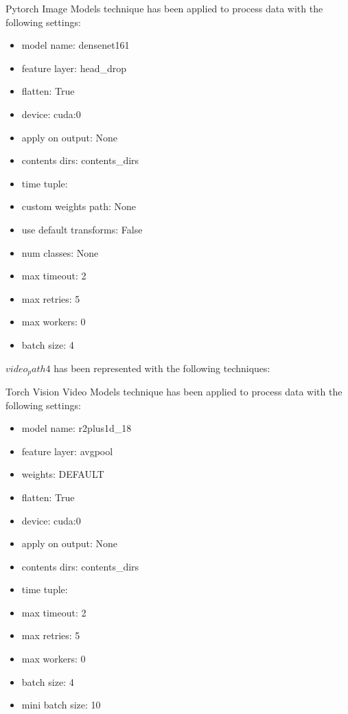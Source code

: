 \documentclass[11pt]{article}
\begin{document}
Pytorch Image Models technique has been applied to process data with the following settings:
\begin{itemize}
    \item model name: densenet161
    \item feature layer: head\_drop
    \item flatten: True
    \item device:  cuda:0
    \item apply on output: None
    \item contents dirs: contents\_dirs
    \item time tuple:
    \item custom weights path: None
    \item use default transforms: False
    \item num classes: None
    \item max timeout: 2
    \item max retries: 5
    \item max workers: 0
    \item batch size:  4
\end{itemize}
\hfill\break
\hfill\break









$ video_path4 $  has been represented with the following techniques:
\hfill\break
\hfill\break



Torch Vision Video Models technique has been applied to process data with the following settings:
\begin{itemize}
    \item model name: r2plus1d\_18
    \item feature layer: avgpool
    \item weights: DEFAULT
    \item flatten: True
    \item device:  cuda:0
    \item apply on output: None
    \item contents dirs: contents\_dirs
    \item time tuple:
    \item max timeout: 2
    \item max retries: 5
    \item max workers: 0
    \item batch size:  4
    \item mini batch size: 10
\end{itemize}
\hfill\break
\hfill\break
\end{document}
